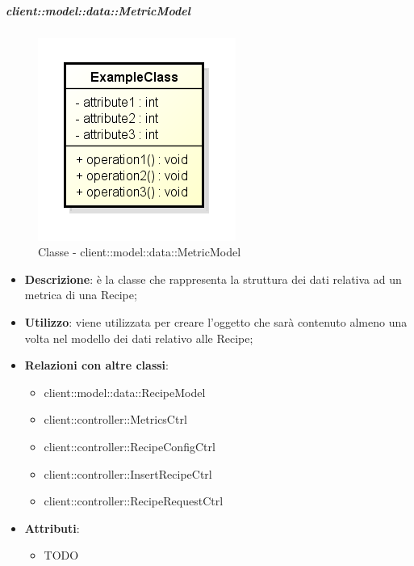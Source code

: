 		\subparagraph{client::model::data::MetricModel} %
		\label{subp:client_model_data_metricmodel}
			\begin{figure}[htbp]
				\centering
				\centerline{\includegraphics[scale=0.7]{./images/client/classes/example_class.png}}
				\caption{Classe - client::model::data::MetricModel}
			\end{figure}
			\begin{itemize}
				\item \textbf{Descrizione}: è la classe che rappresenta la struttura dei dati relativa ad un metrica di una Recipe;
				\item \textbf{Utilizzo}: viene utilizzata per creare l'oggetto che sarà contenuto almeno una volta nel modello dei dati relativo alle Recipe;
				\item \textbf{Relazioni con altre classi}:
					\begin{itemize}
						\item client::model::data::RecipeModel
						\item client::controller::MetricsCtrl
						\item client::controller::RecipeConfigCtrl
						\item client::controller::InsertRecipeCtrl
						\item client::controller::RecipeRequestCtrl
					\end{itemize}
				\item \textbf{Attributi}:
					\begin{itemize}
						\item TODO
					\end{itemize}
			\end{itemize}


